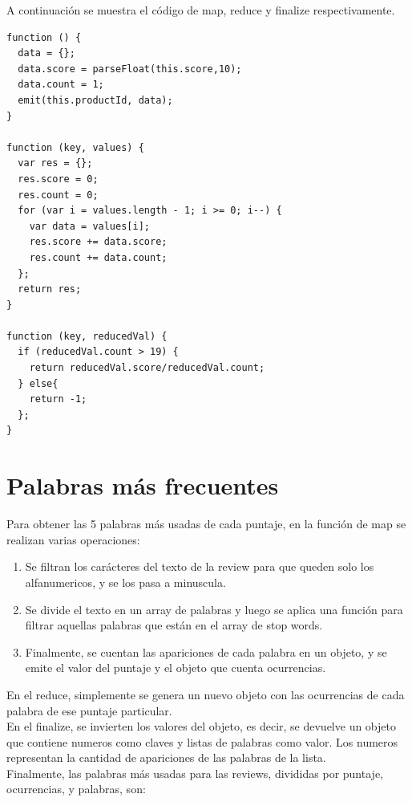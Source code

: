 \documentclass{article}
\begin{document}
A continuaci\'on se muestra el c\'odigo de map, reduce y finalize respectivamente.

\begin{lstlisting}
function () {
  data = {};
  data.score = parseFloat(this.score,10);
  data.count = 1;
  emit(this.productId, data);
}

function (key, values) {
  var res = {};
  res.score = 0;
  res.count = 0;
  for (var i = values.length - 1; i >= 0; i--) {
    var data = values[i];
    res.score += data.score;
    res.count += data.count;
  };
  return res;
}

function (key, reducedVal) {
  if (reducedVal.count > 19) {
    return reducedVal.score/reducedVal.count; 
  } else{
    return -1;
  };
}
\end{lstlisting}

\section{Palabras m\'as frecuentes}

 Para obtener las 5 palabras m\'as usadas de cada puntaje, en la funci\'on de map se realizan varias operaciones:

\begin{enumerate}
  \item Se filtran los car\'acteres del texto de la review para que queden solo los alfanumericos, y se los pasa a minuscula.

  \item Se divide el texto en un array de palabras y luego se aplica una funci\'on para filtrar aquellas palabras que est\'an en el array de stop words.

  \item Finalmente, se cuentan las apariciones de cada palabra en un objeto, y se emite el valor del puntaje y el objeto que cuenta ocurrencias.
\end{enumerate}

 En el reduce, simplemente se genera un nuevo objeto con las ocurrencias de cada palabra de ese puntaje particular.
\\ En el finalize, se invierten los valores del objeto, es decir, se devuelve un objeto que contiene numeros como claves y listas de palabras como valor. Los numeros representan la cantidad de apariciones de las palabras de la lista.
\\ Finalmente, las palabras m\'as usadas para las reviews, divididas por puntaje, ocurrencias, y palabras, son:
\end{document}

